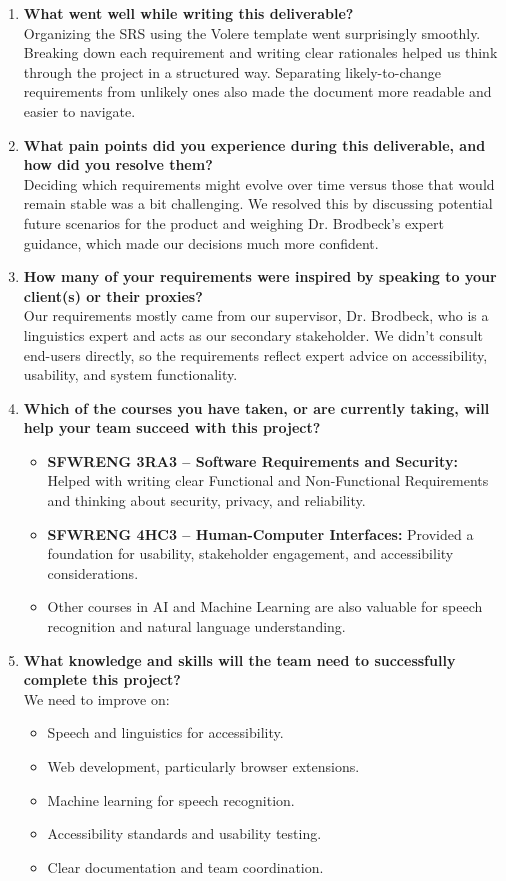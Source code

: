 \begin{enumerate}
  \item \textbf{What went well while writing this deliverable?} \\
  Organizing the SRS using the Volere template went surprisingly smoothly. Breaking down each requirement and writing clear rationales helped us think through the project in a structured way. Separating likely-to-change requirements from unlikely ones also made the document more readable and easier to navigate.

  \item \textbf{What pain points did you experience during this deliverable, and how did you resolve them?} \\
  Deciding which requirements might evolve over time versus those that would remain stable was a bit challenging. We resolved this by discussing potential future scenarios for the product and weighing Dr. Brodbeck’s expert guidance, which made our decisions much more confident.

  \item \textbf{How many of your requirements were inspired by speaking to your client(s) or their proxies?} \\
  Our requirements mostly came from our supervisor, Dr. Brodbeck, who is a linguistics expert and acts as our secondary stakeholder. We didn’t consult end-users directly, so the requirements reflect expert advice on accessibility, usability, and system functionality.

  \item \textbf{Which of the courses you have taken, or are currently taking, will help your team succeed with this project?} \\
  \begin{itemize}
    \item \textbf{SFWRENG 3RA3 – Software Requirements and Security:} Helped with writing clear Functional and Non-Functional Requirements and thinking about security, privacy, and reliability.
    \item \textbf{SFWRENG 4HC3 – Human-Computer Interfaces:} Provided a foundation for usability, stakeholder engagement, and accessibility considerations.
    \item Other courses in AI and Machine Learning are also valuable for speech recognition and natural language understanding.
  \end{itemize}

  \item \textbf{What knowledge and skills will the team need to successfully complete this project?} \\
  We need to improve on:
  \begin{itemize}
    \item Speech and linguistics for accessibility.
    \item Web development, particularly browser extensions.
    \item Machine learning for speech recognition.
    \item Accessibility standards and usability testing.
    \item Clear documentation and team coordination.
  \end{itemize}


\end{enumerate}
